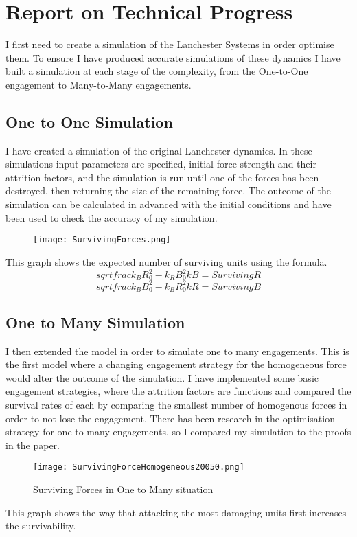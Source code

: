 \chapter{Report on Technical Progress}
I first need to create a simulation of the Lanchester Systems in order optimise them. To ensure I have produced accurate simulations of these dynamics I have built a simulation at each stage of the complexity, from the One-to-One engagement to Many-to-Many engagements.
\section{One to One Simulation}
I have created a simulation of the original Lanchester dynamics. In these simulations input parameters are specified, initial force strength and their attrition factors, and the simulation is run until one of the forces has been destroyed, then returning the size of the remaining force. The outcome of the simulation can be calculated in advanced with the initial conditions and have been used to check the accuracy of my simulation.  
\begin{figure}[h!]
    \texttt{[image: SurvivingForces.png]}
    \label{fig:Graph 1}
\end{figure}
This graph shows the expected number of surviving units using the formula.
\[ sqrt{frac{k_B R_0^2 - k_R B_0^2} {kB} } = Surviving R\] 
\[ sqrt{frac{k_B B_0^2 - k_B R_0^2} {kR} } = Surviving B\] 

\section{One to Many Simulation}
I then extended the model in order to simulate one to many engagements. This is the first model where a changing engagement strategy for the homogeneous force would alter the outcome of the simulation. I have implemented some basic engagement strategies, where the attrition factors are functions and compared the survival rates of each by comparing the smallest number of homogenous forces in order to not lose the engagement. There has been research in the optimisation strategy for one to many engagements, so I compared my simulation to the proofs in the paper.

\begin{figure}[h!]
    \texttt{[image: SurvivingForceHomogeneous20050.png]}
    \caption{Surviving Forces in One to Many situation}
  \end{figure}
This graph shows the way that attacking the most damaging units first increases the survivability.
